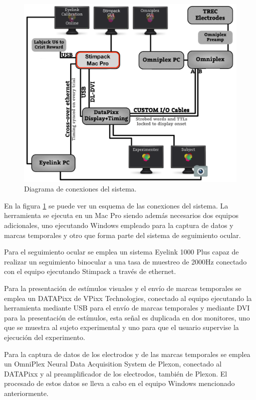 \documentclass[conference]{IEEEtran}
\begin{document}
\begin{figure}[tp]
\centerline{\includegraphics[width=\linewidth]{figures/system_diagram.png}}
\caption{Diagrama de conexiones del sistema.}
\label{figSysDiagram}
\end{figure}
En la figura \ref{figSysDiagram} se puede ver un esquema de las conexiones del sistema. La herramienta se ejecuta en un Mac Pro siendo además necesarios dos equipos adicionales, uno ejecutando Windows empleado para la captura de datos y marcas temporales y otro que forma parte del sistema de seguimiento ocular.

Para el seguimiento ocular se emplea un sistema Eyelink 1000 Plus\cite{eyelink} capaz de realizar un seguimiento binocular a una tasa de muestreo de 2000Hz conectado con el equipo ejecutando Stimpack a través de ethernet.

Para la presentación de estímulos visuales y el envío de marcas temporales se emplea un DATAPixx \cite{datapixx} de VPixx Technologies, conectado al equipo ejecutando la herramienta mediante USB para el envío de marcas temporales y mediante DVI para la presentación de estímulos, esta señal es duplicada en dos monitores, uno que se muestra al sujeto experimental y uno para que el usuario supervise la ejecución del experimento.

Para la captura de datos de los electrodos y de las marcas temporales se emplea un OmniPlex Neural Data Acquisition System\cite{omniplex} de Plexon, conectado al DATAPixx y al preamplificador de los electrodos, también de Plexon. El procesado de estos datos se lleva a cabo en el equipo Windows mencionado anteriormente.
\end{document}
